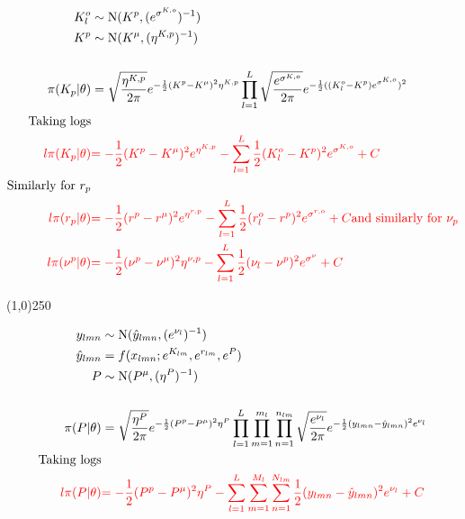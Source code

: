 \begin{align*}
K_{l}^o &\sim \operatorname{N}(K^p, (e^{ \sigma^{K,o} })^{-1} )\\
K^p &\sim \operatorname{N}(K^\mu, ({\eta^{K,p}})^{-1} )\\
\\
\pi(K_p|\theta)&=
\sqrt{\frac{\eta^{K,p}}{2\pi}} e^{-\frac{1}{2}(K^p-K^\mu)^{2}\eta^{K,p} }
\prod_{l=1}^{L}\sqrt{\frac{e^{ \sigma^{K,o} }}{2\pi}} e^{-\frac{1}{2}((K_{l}^o-K^p)e^{ \sigma^{K,o} })^{2} }\\
\text{Taking logs}\\
\color{red}{l\pi(K_p|\theta)}&
\color{red}{
=-\frac{1}{2}(K^p-K^\mu)^{2}e^{\eta^{K,p}}
-
\sum_{l=1}^{L}\frac{1}{2}(K_{l}^o-K^p)^{2}e^{ \sigma^{K,o} }
+C
}\\
\text{Similarly for $r_p$}\\
\color{red}{l\pi(r_p|\theta)}&
\color{red}{
=-\frac{1}{2}(r^p-r^\mu)^{2}e^{\eta^{r,p}}
-
\sum_{l=1}^{L}\frac{1}{2}(r_{l}^o-r^p)^{2}e^{ \sigma^{r,o} }
+C} 
\text{and similarly for $\nu_p$}\\
\color{red}{l\pi(\nu^p|\theta)}&
\color{red}{
=-\frac{1}{2}(\nu^p-\nu^\mu)^{2}\eta^{\nu,p}
-
\sum_{l=1}^{L}
\frac{1}{2}(\nu_{l}-\nu^p)^{2}e^{ {\sigma}^{\nu} } 
+C}
\end{align*}


\begin{center}
\line(1,0){250}
\end{center}

\begin{align*}
y_{lmn} &\sim \operatorname{N}(\hat{y}_{lmn},(e^{ \nu_{l}})^{-1} ) \\
\hat{y}_{lmn} &= f(x_{lmn};e^{ K_{lm} } ,e^{ r_{lm} } , e^{ P })\\
P &\sim \operatorname{N}(P^\mu, ({\eta^{P}})^{-1} )\\
\\
\pi(P|\theta)&=
\sqrt{\frac{\eta^{P}}{2\pi}} e^{-\frac{1}{2}(P^p-P^\mu)^{2}\eta^{P} }
\prod_{l=1}^{L}\prod_{m=1}^{m_{l}}\prod_{n=1}^{n_{lm}}
\sqrt{\frac{e^{ \nu_{l}}}{2\pi}} e^{-\frac{1}{2}(y_{lmn}-\hat{y}_{lmn})^{2}e^{ \nu_{l}} }\\
\text{Taking logs}\\
\color{red}{l\pi(P|\theta)}&
\color{red}{
=-\frac{1}{2}(P^p-P^\mu)^{2}\eta^{P}
-
\sum_{l=1}^{L}\sum_{m=1}^{M_{l}}\sum_{n=1}^{N_{lm}}
\frac{1}{2}(y_{lmn}-\hat{y}_{lmn})^{2}e^{\nu_{l}}
+C}\end{align*}
